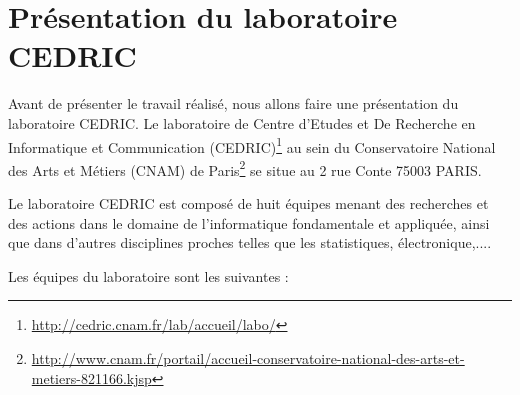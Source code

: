 \documentclass[11pt]{article}
\begin{document}
\section{Présentation du laboratoire CEDRIC}\label{ann:cedric}
	Avant de présenter le travail réalisé, nous allons faire une présentation du laboratoire CEDRIC.
	Le laboratoire de Centre d'Etudes et De Recherche en Informatique et Communication (CEDRIC)\footnote{\href{http://cedric.cnam.fr/lab/accueil/labo/}{http://cedric.cnam.fr/lab/accueil/labo/}} au sein du Conservatoire National des Arts et Métiers (CNAM) de Paris\footnote{\href{http://www.cnam.fr/portail/accueil-conservatoire-national-des-arts-et-metiers-821166.kjsp}{http://www.cnam.fr/portail/accueil-conservatoire-national-des-arts-et-metiers-821166.kjsp}} se situe au 2 rue Conte 75003 PARIS.\par
	Le laboratoire CEDRIC est composé de huit équipes menant des recherches et des actions dans le domaine de l'informatique fondamentale et appliquée, ainsi que dans d'autres disciplines proches telles que les statistiques, électronique,....\par
	Les équipes du laboratoire sont les suivantes :
\end{document}
